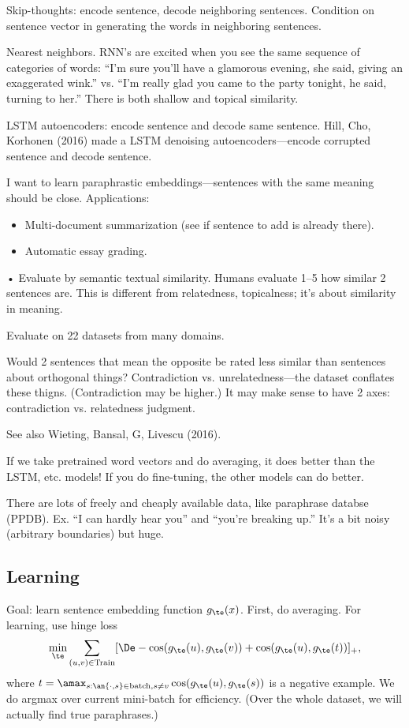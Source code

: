 Skip-thoughts: encode sentence, decode neighboring sentences. %
Condition on sentence vector in generating the words in neighboring sentences.

Nearest neighbors. RNN's are excited when you see the same sequence of categories of words: ``I'm sure you'll have a glamorous evening, she said, giving an exaggerated wink.'' vs. ``I'm really glad you came to the party tonight, he said, turning to her.'' There is both shallow and topical similarity.

LSTM autoencoders: encode sentence and decode same sentence. Hill, Cho, Korhonen (2016) made a LSTM denoising autoencoders---encode corrupted sentence and decode sentence.

I want to learn paraphrastic embeddings---sentences with the same meaning should be close.
Applications:
\begin{itemize}
\item
Multi-document summarization (see if sentence to add is already there).
\item
Automatic essay grading.
\end{itemize}•
Evaluate by semantic textual similarity. Humans evaluate 1--5 how similar 2 sentences are.
This is different from relatedness, topicalness; it's about similarity in meaning.

Evaluate on 22 datasets from many domains.

Would 2 sentences that mean the opposite be rated less similar than sentences about orthogonal things? Contradiction vs. unrelatedness---the dataset conflates these thigns. (Contradiction may be higher.) It may make sense to have 2 axes: contradiction vs. relatedness judgment.

See also Wieting, Bansal, G, Livescu (2016). 

If we take pretrained word vectors and do averaging, it does better than the LSTM, etc. models! If you do fine-tuning, the other models can do better.

There are lots of freely and cheaply available data, like paraphrase databse (PPDB). Ex. ``I can hardly hear you'' and ``you're breaking up.'' It's a bit noisy (arbitrary boundaries) but huge.

\subsection{Learning}

Goal: learn sentence embedding function $g_\te(x)$. First, do averaging. For learning, use hinge loss
$$
\min_\te\sum_{(u,v)\in \text{Train}} [\De - \cos(g_\te(u),g_\te(v)) + \cos(g_\te(u),g_\te(t))]_+,
$$
where $t=\amax_{s:\an{\cdot, s}\in \text{batch}, s\ne v} \cos(g_\te(u),g_\te(s))$ is a negative example. We do argmax over current mini-batch for efficiency. (Over the whole dataset, we will actually find true paraphrases.)

